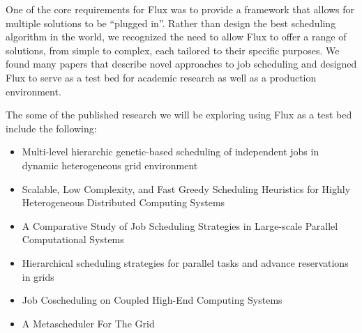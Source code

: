 One of the core requirements for Flux was to provide a framework that
allows for multiple solutions to be ``plugged in''.  Rather than
design the best scheduling algorithm in the world, we recognized the
need to allow Flux to offer a range of solutions, from simple to
complex, each tailored to their specific purposes.  We found many
papers that describe novel approaches to job scheduling and designed
Flux to serve as a test bed for academic research as well as a
production environment.

The some of the published research we will be exploring using Flux as a
test bed include the following:

\begin{itemize}
\item Multi-level hierarchic genetic-based scheduling of independent jobs in dynamic heterogeneous grid environment~\cite{Koodziej20121}

\item Scalable, Low Complexity, and Fast Greedy Scheduling Heuristics for Highly Heterogeneous Distributed Computing Systems~\cite{Diaz13}

\item A Comparative Study of Job Scheduling Strategies in Large-scale Parallel Computational Systems~\cite{chandio2013comparative}

\item Hierarchical scheduling strategies for parallel tasks and advance reservations in grids~\cite{Kurowski13}

\item Job Coscheduling on Coupled High-End Computing Systems~\cite{6047306}

\item A Metascheduler For The Grid~\cite{1029934}

\end{itemize}
